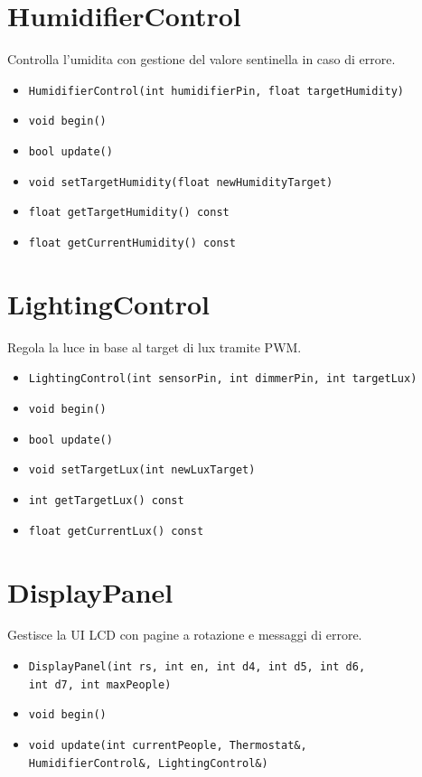 \section{HumidifierControl}
Controlla l'umidita con gestione del valore sentinella in caso di errore.
\begin{itemize}
  \item \texttt{HumidifierControl(int humidifierPin, float targetHumidity)}
  \item \texttt{void begin()}
  \item \texttt{bool update()}
  \item \texttt{void setTargetHumidity(float newHumidityTarget)}
  \item \texttt{float getTargetHumidity() const}
  \item \texttt{float getCurrentHumidity() const}
\end{itemize}

\section{LightingControl}
Regola la luce in base al target di lux tramite PWM.
\begin{itemize}
  \item \texttt{LightingControl(int sensorPin, int dimmerPin, int targetLux)}
  \item \texttt{void begin()}
  \item \texttt{bool update()}
  \item \texttt{void setTargetLux(int newLuxTarget)}
  \item \texttt{int getTargetLux() const}
  \item \texttt{float getCurrentLux() const}
\end{itemize}

\section{DisplayPanel}
Gestisce la UI LCD con pagine a rotazione e messaggi di errore.
\begin{itemize}
  \item \texttt{DisplayPanel(int rs, int en, int d4, int d5, int d6,}\\
        \texttt{int d7, int maxPeople)}
  \item \texttt{void begin()}
  \item \texttt{void update(int currentPeople, Thermostat\&,}\\
        \texttt{HumidifierControl\&, LightingControl\&)}
\end{itemize}

